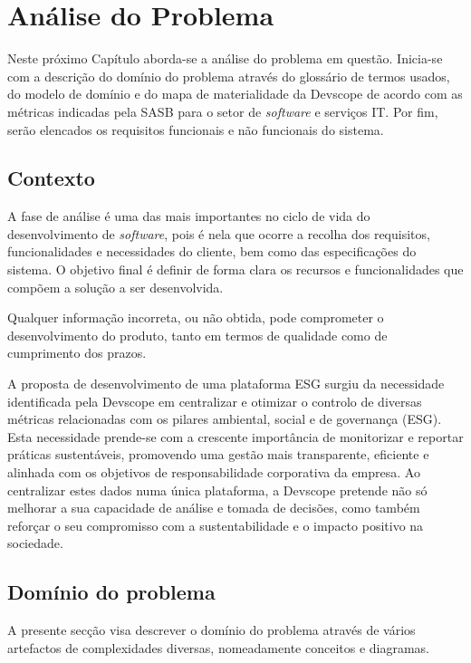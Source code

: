 
\chapter{Análise do Problema}
\label{chap:AP}

Neste próximo Capítulo aborda-se a análise do problema em questão. Inicia-se com a descrição do domínio do problema através do glossário de termos usados, do modelo de domínio e do mapa de materialidade da Devscope de acordo com as métricas indicadas pela \gls{SASB} para o setor de \textit{software} e serviços IT. Por fim, serão elencados os requisitos funcionais e não funcionais do sistema.

\section{Contexto}
\label{sec:Context}

A fase de análise é uma das mais importantes no ciclo de vida do desenvolvimento de \textit{software}, pois é nela que ocorre a recolha dos requisitos, funcionalidades e necessidades do cliente, bem como das especificações do sistema. O objetivo final é definir de forma clara os recursos e funcionalidades que compõem a solução a ser desenvolvida.

Qualquer informação incorreta, ou não obtida, pode comprometer o desenvolvimento do produto, tanto em termos de qualidade como de cumprimento dos prazos.

A proposta de desenvolvimento de uma plataforma ESG surgiu da necessidade identificada pela Devscope em centralizar e otimizar o controlo de diversas métricas relacionadas com os pilares ambiental, social e de governança (ESG). Esta necessidade prende-se com a crescente importância de monitorizar e reportar práticas sustentáveis, promovendo uma gestão mais transparente, eficiente e alinhada com os objetivos de responsabilidade corporativa da empresa. Ao centralizar estes dados numa única plataforma, a Devscope pretende não só melhorar a sua capacidade de análise e tomada de decisões, como também reforçar o seu compromisso com a sustentabilidade e o impacto positivo na sociedade.

\section{Domínio do problema}
\label{sec:DP} 

A presente secção visa descrever o domínio do problema através de vários artefactos de complexidades diversas, nomeadamente conceitos e diagramas.

